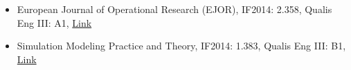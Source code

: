 \begin{journals}

\begin{itemize}
\item European Journal of Operational Research (EJOR), IF2014: 2.358, Qualis Eng III: A1, \href{http://www.journals.elsevier.com/european-journal-of-operational-research/}{Link} 
\item Simulation Modeling Practice and Theory, IF2014: 1.383, Qualis Eng III: B1, \href{http://www.journals.elsevier.com/simulation-modelling-practice-and-theory/}{Link}
\end{itemize}

\end{journals}